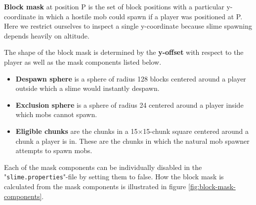 \documentclass[12pt]{article}
\begin{document}
\textbf{Block mask} at position P is the set of block positions with a particular y-coordinate in which a hostile mob could spawn if a player was positioned at P. Here we restrict ourselves to inspect a single y-coordinate because slime spawning depends heavily on altitude. 

The shape of the block mask is determined by the \textbf{y-offset} with respect to the player as well as the mask components listed below.
\begin{itemize}[label={},leftmargin=1cm]
\item \textbf{Despawn sphere} is a sphere of radius 128 blocks centered around a player outside which a slime would instantly despawn.
\item \textbf{Exclusion sphere} is a sphere of radius 24 centered around a player inside which mobs cannot spawn.
\item \textbf{Eligible chunks} are the chunks in a 15$\times$15-chunk square centered around a chunk a player is in. These are the chunks in which the natural mob spawner attempts to spawn mobs.
\end{itemize}
Each of the mask components can be individually disabled in the "\texttt{slime.properties}"-file by setting them to false. How the block mask is calculated from the mask components is illustrated in figure \ref{fig:block-mask-components}.
\end{document}
